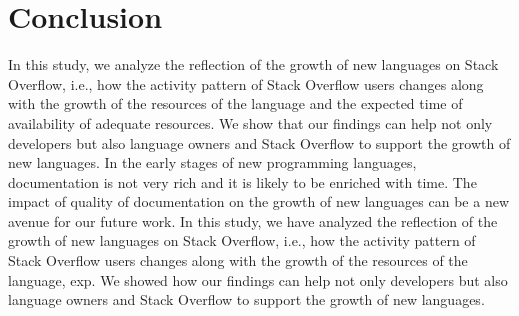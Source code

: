 \section{Conclusion}
\label{sec:conclusion}
In this study, we analyze the reflection of the growth of new languages on Stack Overflow, i.e., how the activity pattern of Stack Overflow users changes along with the growth of the resources of the language and the expected time of availability of adequate resources. We show that our findings can help not only developers but also language owners and Stack Overflow to support the growth of new languages. In the early stages of new programming languages, documentation is not very rich and it is likely to be enriched with time. The impact of quality of documentation on the growth of new languages can be a new avenue for our future work. In this study, we have analyzed the reflection of the growth of new languages on Stack Overflow, i.e., how the activity pattern of Stack Overflow users changes along with the growth of the resources of the language, exp. We showed how our findings can help not only developers but also language owners and  Stack Overflow to support the growth of new languages. 


